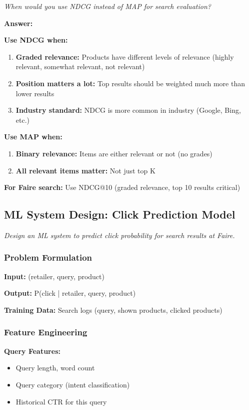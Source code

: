\documentclass[11pt,letterpaper]{article}
\begin{document}
\textit{When would you use NDCG instead of MAP for search evaluation?}

\textbf{Answer:}

\textbf{Use NDCG when:}
\begin{enumerate}
    \item \textbf{Graded relevance:} Products have different levels of relevance (highly relevant, somewhat relevant, not relevant)
    \item \textbf{Position matters a lot:} Top results should be weighted much more than lower results
    \item \textbf{Industry standard:} NDCG is more common in industry (Google, Bing, etc.)
\end{enumerate}

\textbf{Use MAP when:}
\begin{enumerate}
    \item \textbf{Binary relevance:} Items are either relevant or not (no grades)
    \item \textbf{All relevant items matter:} Not just top K
\end{enumerate}

\textbf{For Faire search:} Use NDCG@10 (graded relevance, top 10 results critical)

\subsection{ML System Design: Click Prediction Model}

\textit{Design an ML system to predict click probability for search results at Faire.}

\subsubsection{Problem Formulation}

\textbf{Input:} (retailer, query, product)

\textbf{Output:} P(click | retailer, query, product)

\textbf{Training Data:} Search logs (query, shown products, clicked products)

\subsubsection{Feature Engineering}

\textbf{Query Features:}
\begin{itemize}
    \item Query length, word count
    \item Query category (intent classification)
    \item Historical CTR for this query
\end{itemize}
\end{document}
